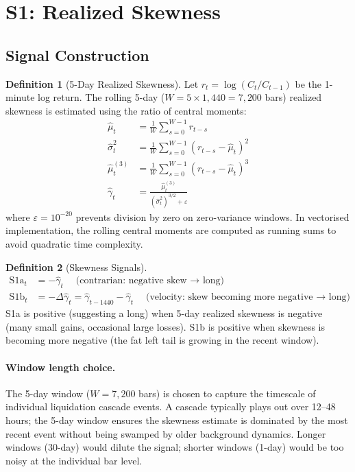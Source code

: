 \documentclass[12pt, a4paper]{article}
\theoremstyle{plain}
\theoremstyle{definition}
\newtheorem{definition}{Definition}[section]
\begin{document}
\section{S1: Realized Skewness}
\label{sec:s1}

\subsection{Signal Construction}

\begin{definition}[5-Day Realized Skewness]
  Let $r_t = \log(C_t / C_{t-1})$ be the 1-minute log return.
  The rolling 5-day ($W = 5 \times 1{,}440 = 7{,}200$ bars) realized
  skewness is estimated using the ratio of central moments:
  \begin{align}
    \hat{\mu}_t &= \frac{1}{W}\sum_{s=0}^{W-1} r_{t-s} \\
    \hat{\sigma}^2_t &= \frac{1}{W}\sum_{s=0}^{W-1}(r_{t-s} - \hat{\mu}_t)^2 \\
    \hat{\mu}^{(3)}_t &= \frac{1}{W}\sum_{s=0}^{W-1}(r_{t-s} - \hat{\mu}_t)^3 \\
    \hat{\gamma}_t &= \frac{\hat{\mu}^{(3)}_t}{(\hat{\sigma}^2_t)^{3/2} + \varepsilon}
    \label{eq:realskew}
  \end{align}
  where $\varepsilon = 10^{-20}$ prevents division by zero on
  zero-variance windows.  In vectorised implementation, the rolling
  central moments are computed as running sums to avoid quadratic
  time complexity.
\end{definition}

\begin{definition}[Skewness Signals]
  \begin{align}
    \text{S1a}_t &= -\hat{\gamma}_t
      \quad\text{(contrarian: negative skew $\to$ long)} \\
    \text{S1b}_t &= -\Delta\hat{\gamma}_t = \hat{\gamma}_{t-1440} - \hat{\gamma}_t
      \quad\text{(velocity: skew becoming more negative $\to$ long)}
  \end{align}
  S1a is positive (suggesting a long) when 5-day realized skewness is
  negative (many small gains, occasional large losses).  S1b is positive
  when skewness is becoming more negative (the fat left tail is
  growing in the recent window).
\end{definition}

\paragraph{Window length choice.}
The 5-day window ($W = 7{,}200$ bars) is chosen to capture the timescale
of individual liquidation cascade events.  A cascade typically plays out
over 12--48 hours; the 5-day window ensures the skewness estimate is
dominated by the most recent event without being swamped by older
background dynamics.  Longer windows (30-day) would dilute the signal;
shorter windows (1-day) would be too noisy at the individual bar level.
\end{document}
